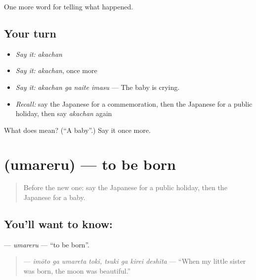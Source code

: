 \begin{grammarlens}[title={What you've built}]
One more word for telling what happened.
\end{grammarlens}

\subsection*{Your turn}
\begin{itemize}
\raggedright
  \item \emph{Say it:} \emph{akachan}
  \item \emph{Say it:} \emph{akachan}, once more
  \item \emph{Say it:} \emph{akachan ga naite imasu} — The baby is crying.
  \item \emph{Recall:} say the Japanese for a commemoration, then the Japanese for a public holiday, then say \emph{akachan} again
\end{itemize}

\begin{tcolorbox}[breakable,colback=teal!4,colframe=teal!35!black,title={Before you move on}]
What does  mean? (\textquotedblleft{}A baby\textquotedblright{}.) Say it once more.
\end{tcolorbox}
\section[\texorpdfstring{\ja{うまれる} (umareru)}{うまれる (umareru)}]{ (umareru) — to be born}

\label{lesson:JA-C286-umareru}



\begin{quote}
Before the new one: say the Japanese for a public holiday, then the Japanese for a baby.
\end{quote}

\subsection*{You'll want to know: }
\textbf{} — \emph{umareru} — \textquotedblleft{}to be born\textquotedblright{}.

\begin{quote}
\textbf{   } — \emph{imōto ga umareta toki, tsuki ga kirei deshita} — \textquotedblleft{}When my little sister was born, the moon was beautiful.\textquotedblright{}
\end{quote}

